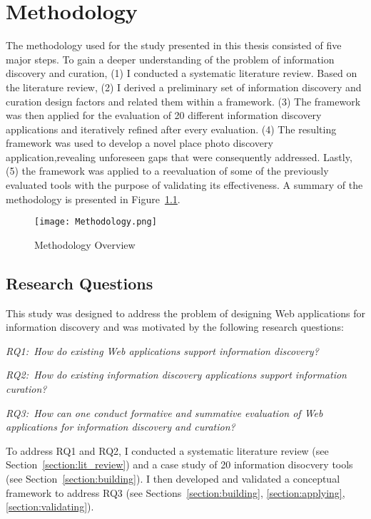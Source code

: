 \chapter{Methodology}
\label{chapter:methodology}

The methodology used for the study presented in this thesis consisted of five major steps. To gain a deeper understanding of the problem of information discovery and curation, (1) I conducted a systematic literature review. Based on the literature review, (2) I derived a preliminary set of information discovery and curation design factors and related them within a framework. (3) The framework was then applied for the evaluation of 20 different information discovery applications and iteratively refined after every evaluation. (4) The resulting framework was used to develop a novel place photo discovery application,revealing unforeseen gaps that were consequently addressed. Lastly, (5) the framework was applied to a reevaluation of some of the previously evaluated tools with the purpose of validating its effectiveness.  A summary of the methodology is presented in Figure~\ref{fig:methodology}.
\begin{figure}[ht!]
	\noindent
	\centering
	\texttt{[image: Methodology.png]}
	\caption{Methodology Overview}
	\label{fig:methodology} 
\end{figure}

{\section{Research Questions}
This study was designed to address the problem of designing Web applications for information discovery and was motivated by the following research questions:

\emph{RQ1:~How do existing Web applications support information discovery?}

\emph{RQ2:~How do existing information discovery applications support information curation?}

\emph{RQ3:~How can one conduct formative and summative evaluation of Web applications for information discovery and curation?}
\pagebreak

To address RQ1 and RQ2, I conducted a systematic literature review (see Section~\ref{section:lit_review}) and a case study of 20 information disocvery tools (see Section~\ref{section:building}). I then developed and validated a conceptual framework to address RQ3 (see Sections~\ref{section:building}, \ref{section:applying}, \ref{section:validating}). 
}%

